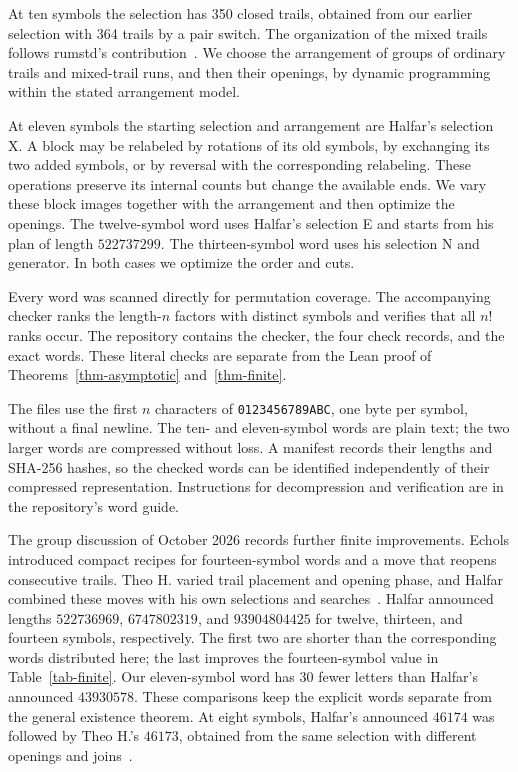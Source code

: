 \documentclass[11pt]{article}
\newcommand{\word}[1]{\texttt{#1}}
\begin{document}
At ten symbols the selection has 350 closed trails, obtained from our
earlier selection with 364 trails by a pair switch. The organization of
the mixed trails follows rumstd's contribution~\cite{rumstd}. We choose
the arrangement of groups of ordinary trails and mixed-trail runs, and
then their openings, by dynamic programming within the stated arrangement
model.

At eleven symbols the starting selection and arrangement are Halfar's
selection X. A block may be relabeled by rotations of its old symbols,
by exchanging its two added symbols, or by reversal with the corresponding
relabeling. These operations preserve its internal counts but change the
available ends. We vary these block images together with the arrangement
and then optimize the openings. The twelve-symbol word uses Halfar's
selection E and starts from his plan of length $\num{522737299}$. The
thirteen-symbol word uses his selection N and generator. In both cases
we optimize the order and cuts.

Every word was scanned directly for permutation coverage. The accompanying
checker ranks the length-$n$ factors with distinct symbols and verifies
that all $n!$ ranks occur. The repository contains the checker, the four
check records, and the exact words. These literal checks are separate
from the Lean proof of Theorems~\ref{thm-asymptotic} and~\ref{thm-finite}.

The files use the first $n$ characters of \word{0123456789ABC}, one byte
per symbol, without a final newline. The ten- and eleven-symbol words are
plain text; the two larger words are compressed without loss. A manifest
records their lengths and SHA-256 hashes, so the checked words can be
identified independently of their compressed representation. Instructions
for decompression and verification are in the repository's word guide.

The group discussion of October 2026 records further finite improvements.
Echols introduced compact recipes for fourteen-symbol words and a move that
reopens consecutive trails. Theo H. varied trail placement and opening phase,
and Halfar combined these moves with his own selections and searches~\cite{discussion}.
Halfar announced lengths $\num{522736969}$, $\num{6747802319}$, and
$\num{93904804425}$ for twelve, thirteen, and fourteen symbols, respectively.
The first two are shorter than the corresponding words distributed here;
the last improves the fourteen-symbol value in Table~\ref{tab-finite}.
Our eleven-symbol word has $30$ fewer letters than Halfar's announced
$\num{43930578}$. These comparisons keep the explicit words separate from
the general existence theorem. At eight symbols, Halfar's announced
$\num{46174}$ was followed by Theo H.'s $\num{46173}$, obtained from the
same selection with different openings and joins~\cite{eight}.
\end{document}
